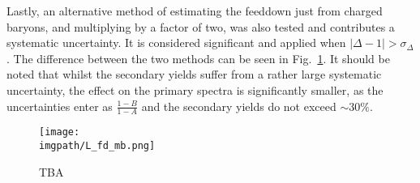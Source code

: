 Lastly, an alternative method of estimating the feeddown just from charged \XI baryons, and multiplying by a factor of two, was also tested and contributes a systematic uncertainty. It is considered significant and applied when $|\Delta - 1| > \sigma_\Delta$. The difference between the two methods can be seen in Fig.~\ref{fig:analysis:fdmethod}. It should be noted that whilst the secondary yields suffer from a rather large systematic uncertainty, the effect on the primary spectra is significantly smaller, as the uncertainties enter as $\frac{1-B}{1-A}$ and the secondary yields do not exceed $\sim 30\%$.

\begin{figure}
\texttt{[image: \\imgpath/L\_fd\_mb.png]}
\caption{TBA}
\label{fig:analysis:fdmethod}
\end{figure}


